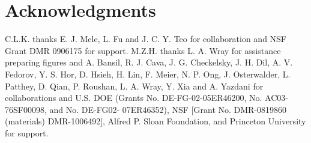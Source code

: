 \documentclass[twocolumn,floatfix,showpacs,rmp,aps]{revtex4}
\begin{document}
\section*{Acknowledgments} C.L.K. thanks E. J. Mele, L. Fu and
J. C. Y. Teo for collaboration and NSF Grant DMR 0906175 for support.
M.Z.H. thanks L. A. Wray for assistance preparing figures and
A. Bansil, R. J. Cava, J. G. Checkelsky, J. H. Dil, A.
V. Fedorov, Y. S. Hor, D. Hsieh, H. Lin, F. Meier, N. P. Ong, J.
Osterwalder, L. Patthey, D. Qian, P. Roushan, L. A. Wray, Y. Xia and A. Yazdani  for
collaborations and U.S. DOE (Grants No. DE-FG-02-05ER46200, No. AC03-76SF00098, and No. DE-FG02-
07ER46352), NSF [Grant No. DMR-0819860 (materials)
DMR-1006492], Alfred P. Sloan Foundation, and Princeton
University for support.
\end{document}

